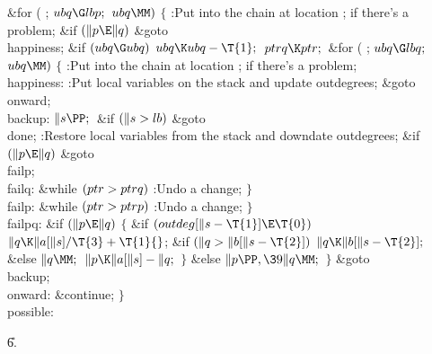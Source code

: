 \&{for} ( ; ${}\\{ubq}\G\\{lbp};{}$ ${}\\{ubq}\MM){}$\5
${}\{{}$\1\6
:Put  into the chain at location ;  if there's a problem\X;\6
\&{if} ${}(\|p\E\|q){}$\1\5
\&{goto} \\{happiness};\2\6
\&{if} ${}(\\{ubq}\G\\{ubq}){}$\1\5
${}\\{ubq}\K\\{ubq}-\T{1};{}$\2\6
${}\\{ptrq}\K\\{ptr};{}$\6
\&{for} ( ; ${}\\{ubq}\G\\{lbq};{}$ ${}\\{ubq}\MM){}$\5
${}\{{}$\1\6
:Put  into the chain at location ;  if there's a problem\X;\6
\4\\{happiness}:\5
:Put local variables on the stack and update outdegrees\X;\6
\&{goto} \\{onward};\6
\4\\{backup}:\5
${}\|s\PP;{}$\6
\&{if} ${}(\|s>\\{lb}){}$\1\5
\&{goto} \\{done};\2\6
:Restore local variables from the stack and downdate outdegrees\X;\6
\&{if} ${}(\|p\E\|q){}$\1\5
\&{goto} \\{failp};\2\6
\4\\{failq}:\5
\&{while} ${}(\\{ptr}>\\{ptrq}){}$\1\5
:Undo a change\X;\2\6
\4${}\}{}$\2\6
\4\\{failp}:\5
\&{while} ${}(\\{ptr}>\\{ptrp}){}$\1\5
:Undo a change\X;\2\6
\4${}\}{}$\2\6
\4\\{failpq}:\5
\&{if} ${}(\|p\E\|q){}$\5
${}\{{}$\1\6
\&{if} ${}(\\{outdeg}[\|s-\T{1}]\E\T{0}){}$\1\5
${}\|q\K\|a[\|s]/\T{3}+\T{1}{}$;\2\6
\&{if} ${}(\|q>\|b[\|s-\T{2}]){}$\1\5
${}\|q\K\|b[\|s-\T{2}];{}$\2\6
\&{else}\1\5
${}\|q\MM;{}$\2\6
${}\|p\K\|a[\|s]-\|q;{}$\6
\4${}\}{}$\5
\2\&{else}\1\5
${}\|p\PP,\39\|q\MM;{}$\2\6
\4${}\}{}$\2\6
\&{goto} \\{backup};\6
\4\\{onward}:\5
\&{continue};\6
\4${}\}{}$\2\6
\\{possible}:\par
\U6.\fi

